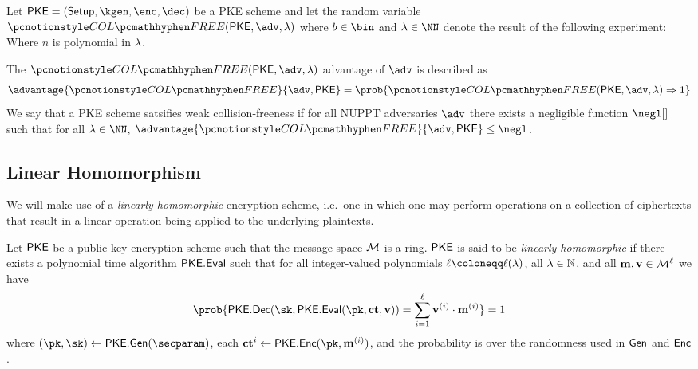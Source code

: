 \begin{definition}
	Let $\pke = (\setup, \kgen, \enc, \dec)$ be a PKE scheme and let the random variable $\collfree(\pke, \adv, \secpar)$ where $b \in \bin$ and $\secpar \in \NN$ denote the result of the following experiment:
	Where $n$ is polynomial in $\lambda$.

	The $\collfree(\pke, \adv, \secpar)$ advantage of $\adv$ is described as
	$$
		\advantage{\collfree}{\adv, \pke} = \prob{\collfree(\pke, \adv, \secpar) \Rightarrow 1}
	$$
	We say that a PKE scheme satsifies weak collision-freeness if for all NUPPT adversaries $\adv$ there exists a negligible function $\negl[]$ such that for all $\secpar \in \NN$, $\advantage{\collfree}{\adv, \pke} \leq \negl$.
\end{definition}

\subsection{Linear Homomorphism}

We will make use of a \emph{linearly homomorphic} encryption scheme, i.e.\ one in which one may perform operations on a collection of ciphertexts that result in a linear operation being applied to the underlying plaintexts.

\begin{definition}\label{def:enc-linear-homomorphism}
	Let $\mathsf{PKE}$ be a public-key encryption scheme such that the message space $\mathcal{M}$ is a ring.
	$\mathsf{PKE}$ is said to be \emph{linearly homomorphic} if there exists a polynomial time algorithm $\mathsf{PKE}.\mathsf{Eval}$ such that for all integer-valued polynomials $\ell \coloneqq \ell(\secpar)$, all $\lambda \in \mathbb{N}$, and all $\mathbf{m}, \mathbf{v} \in \mathcal{M}^\ell$ we have
	\begin{equation*}
		\prob{\encscheme.\Dec(\sk, \encscheme.\Eval(\pk, \ctvec, \vec{v})) = \sum_{i=1}^\ell \veci{v}{i} \cdot \veci{m}{i}} = 1
	\end{equation*}
	where $(\pk, \sk) \gets \encscheme.\Gen(\secparam)$, each $\ctveci{i} \gets \encscheme.\Enc(\pk, \veci{m}{i})$, and the probability is over the randomness used in $\mathsf{Gen}$ and $\mathsf{Enc}$.
\end{definition}

